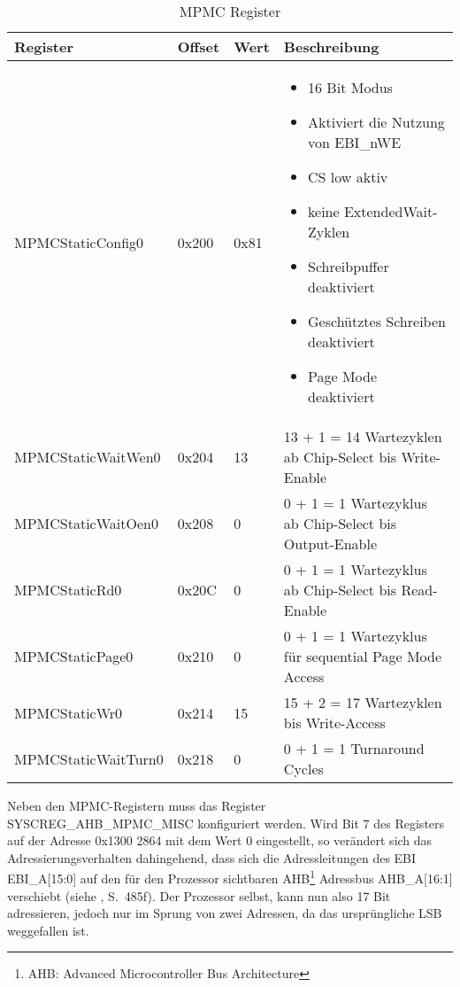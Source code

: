 \begin{table}[h]
\begin{tabular}{|p{4cm}|p{1cm}|p{1cm}|p{6.6cm}|}\hline
\rowcolor{TableBackgroundColor} 
	\textbf{Register} 	& \textbf{Offset} 	& \textbf{Wert} & \textbf{Beschreibung} 							\\ \hline
	MPMCStaticConfig0 	& 0x200 		& 0x81 			& \begin{itemize}
	\item 16 Bit Modus \item Aktiviert die Nutzung von EBI\_nWE \item  CS low aktiv\item  keine ExtendedWait-Zyklen\item  Schreibpuffer deaktiviert\item  Geschütztes Schreiben deaktiviert \item Page Mode deaktiviert 	\end{itemize} 	\\ \hline
	MPMCStaticWaitWen0 	& 0x204 		& 13 			& 13 + 1 = 14 Wartezyklen ab Chip-Select bis Write-Enable 	\\ \hline
	MPMCStaticWaitOen0 	& 0x208 		& 0 			& 0 + 1 = 1 Wartezyklus ab Chip-Select bis Output-Enable  												\\ \hline
	MPMCStaticRd0 		& 0x20C 		& 0 			& 0 + 1 = 1 Wartezyklus ab Chip-Select bis Read-Enable					\\ \hline
	MPMCStaticPage0 	& 0x210 		& 0 			& 0 + 1 = 1 Wartezyklus für sequential Page Mode Access												\\ \hline
	MPMCStaticWr0 		& 0x214 		& 15 			& 15 + 2  = 17 Wartezyklen bis Write-Access	\\ \hline
	MPMCStaticWaitTurn0 & 0x218 		& 0 			& 0 + 1 = 1 Turnaround Cycles 								\\ \hline
\end{tabular}
\caption{MPMC Register}
\label{tab:mpmc_config}
\end{table}
\newpage

Neben den MPMC-Registern muss das Register SYSCREG\_AHB\_MPMC\_MISC konfiguriert werden. Wird Bit 7 des Registers  auf der Adresse 0x1300 2864 mit dem Wert 0 eingestellt, so verändert sich das Adressierungsverhalten dahingehend, dass sich die Adressleitungen des EBI EBI\_A[15:0] auf den für den Prozessor sichtbaren AHB\footnote{AHB: Advanced Microcontroller Bus Architecture} Adressbus AHB\_A[16:1] verschiebt (siehe \cite{NXP2010}, S.~485f). Der Prozessor selbst, kann nun also 17 Bit adressieren, jedoch nur im Sprung von zwei Adressen, da das ursprüngliche LSB weggefallen ist.

